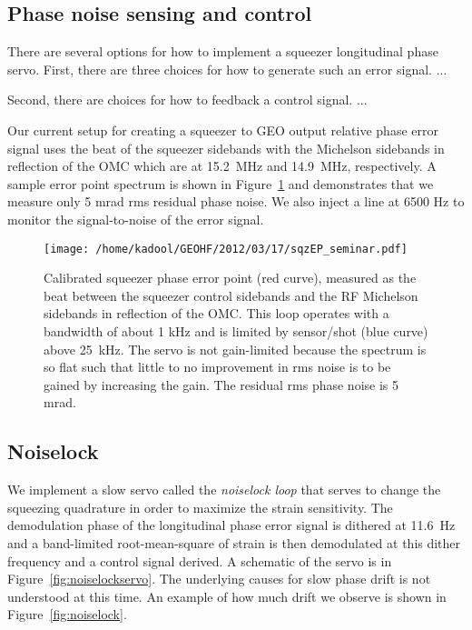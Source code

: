 \documentclass{ligodoc}
\begin{document}
\subsection{Phase noise sensing and control}
There are several options for how to implement a squeezer longitudinal
phase servo. First, there are three choices for how to generate such
an error signal. ...

Second, there are choices for how to feedback a control signal. ...

Our current setup for creating a squeezer to GEO output relative phase
error signal uses the beat of the squeezer sidebands with the
Michelson sidebands in reflection of the OMC which are at 15.2~MHz and
14.9~MHz, respectively. A sample error point spectrum is shown in
Figure~\ref{fig:sqzEP} and demonstrates that we measure only 5 mrad
rms residual phase noise. We also inject a line at 6500 Hz to monitor
the signal-to-noise of the error signal.

\begin{figure}
\begin{centering}
\texttt{[image: /home/kadool/GEOHF/2012/03/17/sqzEP\_seminar.pdf]}
\caption{Calibrated squeezer phase error point (red curve), measured
  as the beat between the squeezer control sidebands and the RF
  Michelson sidebands in reflection of the OMC. This loop operates
  with a bandwidth of about 1 kHz and is limited by sensor/shot (blue
  curve) above 25~kHz. The servo is not gain-limited because the
  spectrum is so flat such that little to no improvement in rms
  noise is to be gained by increasing the gain. The residual rms phase
  noise is 5 mrad.}
\label{fig:sqzEP}
\end{centering}
\end{figure}





\subsection{Noiselock}
We implement a slow servo called the \emph{noiselock loop} that serves
to change the squeezing quadrature in order to maximize the strain
sensitivity. The demodulation phase of the longitudinal phase error
signal is dithered at 11.6~Hz and a band-limited root-mean-square of
strain is then demodulated at this dither frequency and a control
signal derived. A schematic of the servo is in
Figure~\ref{fig:noiselockservo}. The underlying causes for slow phase
drift is not understood at this time. An example of how much drift we
observe is shown in Figure~\ref{fig:noiselock}.
\end{document}
